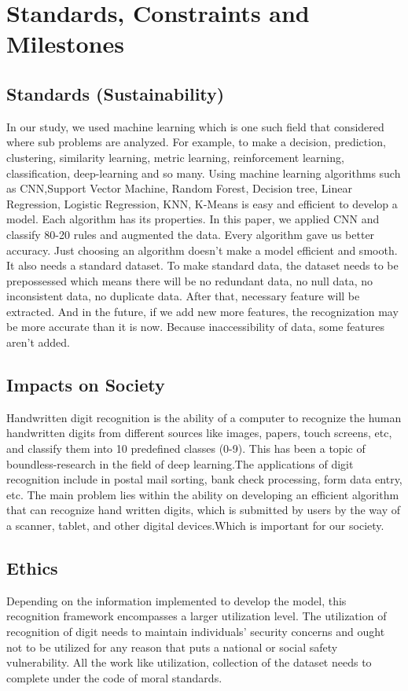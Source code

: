 \section{Standards, Constraints and  Milestones }

\subsection{Standards (Sustainability)}
In our study, we used machine learning which is one such field that considered where sub problems are analyzed. For example, to make a decision, prediction, clustering, similarity learning, metric learning, reinforcement learning, classification, deep-learning and so many. Using machine learning algorithms such as CNN,Support Vector Machine, Random Forest, Decision tree, Linear Regression, Logistic Regression, KNN, K-Means is easy and efficient to develop a model. Each algorithm has its properties. In this paper, we applied  CNN and classify 80-20 rules and augmented the data. Every algorithm gave us better accuracy. Just choosing an algorithm doesn't make a model efficient and smooth. It also needs a standard dataset. To make standard data, the dataset needs to be prepossessed which means there will be no redundant data, no null data, no inconsistent data, no duplicate data. After that, necessary feature will be extracted. And in the future, if we add new more features, the recognization may be more accurate than it is now. Because inaccessibility of data, some features aren't added. 

\subsection{Impacts on Society }
Handwritten digit recognition is the ability of a computer to recognize the human handwritten digits from different sources like images, papers, touch screens, etc, and classify them into 10 predefined classes (0-9). This has been a topic of boundless-research in the field of deep learning.The applications of digit recognition include in postal mail sorting, bank check processing, form data entry, etc. The main problem lies within the ability on developing an efficient algorithm that can recognize hand written digits, which is submitted by users by the way of a scanner, tablet, and other digital devices.Which is important for our society.

\subsection{Ethics}
Depending on the information implemented to develop the model, this recognition framework encompasses a larger utilization level. The utilization of recognition of digit needs to maintain individuals’ security concerns and ought not to be utilized for any reason that puts a national or social safety vulnerability. All the work like utilization, collection of the dataset needs to complete under the code of moral standards.

